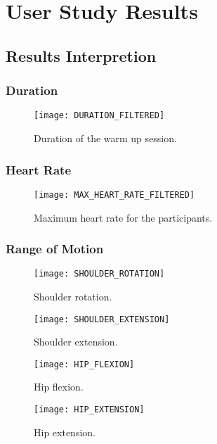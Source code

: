 \chapter{User Study Results}\label{chapter:experiment_results}
\section{Results Interpretion}
\subsection{Duration}
\begin{figure}[h]
    \centering
    \texttt{[image: DURATION\_FILTERED]}
    \caption{Duration of the warm up session.}
    \label{fig:durationOfWarmUp}
\end{figure}
\subsection{Heart Rate}
\begin{figure}[h]
    \centering
    \texttt{[image: MAX\_HEART\_RATE\_FILTERED]}
    \caption{Maximum heart rate for the participants.}
    \label{fig:heartRate}
\end{figure}
\subsection{Range of Motion}
\begin{figure}[h]
    \centering
    \texttt{[image: SHOULDER\_ROTATION]}
    \caption{Shoulder rotation.}
    \label{fig:s_rot}
\end{figure}
\begin{figure}[h]
    \centering
    \texttt{[image: SHOULDER\_EXTENSION]}
    \caption{Shoulder extension.}
    \label{fig:s_ext}
\end{figure}

\begin{figure}[h]
    \centering
    \texttt{[image: HIP\_FLEXION]}
    \caption{Hip flexion.}
    \label{fig:h_flex}
\end{figure}

\begin{figure}[h]
    \centering
    \texttt{[image: HIP\_EXTENSION]}
    \caption{Hip extension.}
    \label{fig:h_ext}
\end{figure}